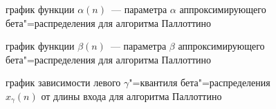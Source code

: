 \documentclass[a4paper,fontsize=14pt]{article}
\begin{document}
\begin{figure}[!]
	\caption{график функции $\alpha(n)$~--- параметра $\alpha$ аппроксимирующего бета"=распределения для алгоритма Паллоттино}
	\label{fig:alpha_plot}
\end{figure}

\begin{figure}[!]
	\caption{график функции $\beta(n)$~--- параметра $\beta$ аппроксимирующего бета"=распределения для алгоритма Паллоттино}
	\label{fig:beta_plot}
\end{figure}

\begin{figure}[!]
	\caption{график зависимости левого $\gamma$"=квантиля бета"=распределения $x_\gamma(n)$ от длины входа для алгоритма Паллоттино}
	\label{fig:quantile}
\end{figure}
\end{document}
